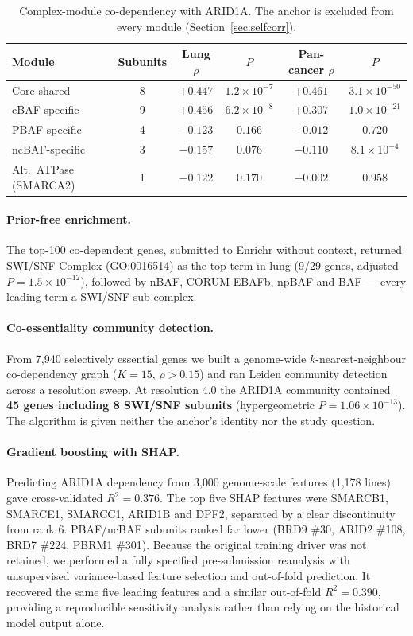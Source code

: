 \documentclass[11pt,a4paper]{article}
\begin{document}
\begin{table}[htbp]
\centering
\caption{Complex-module co-dependency with ARID1A. The anchor is excluded from
every module (Section~\ref{sec:selfcorr}).}
\label{tab:mod}
\small
\begin{tabular}{lccccc}
\toprule
\textbf{Module} & \textbf{Subunits} & \textbf{Lung $\rho$} & \textbf{$P$}
 & \textbf{Pan-cancer $\rho$} & \textbf{$P$} \\
\midrule
Core-shared    & 8 & $+0.447$ & $1.2\times10^{-7}$ & $+0.461$ & $3.1\times10^{-50}$ \\
cBAF-specific  & 9 & $+0.456$ & $6.2\times10^{-8}$ & $+0.307$ & $1.0\times10^{-21}$ \\
PBAF-specific  & 4 & $-0.123$ & $0.166$            & $-0.012$ & $0.720$ \\
ncBAF-specific & 3 & $-0.157$ & $0.076$            & $-0.110$ & $8.1\times10^{-4}$ \\
Alt.\ ATPase (SMARCA2) & 1 & $-0.122$ & $0.170$    & $-0.002$ & $0.958$ \\
\bottomrule
\end{tabular}
\end{table}

\paragraph{Prior-free enrichment.} The top-100 co-dependent genes, submitted to
Enrichr \citep{xie2021} without context, returned SWI/SNF Complex (GO:0016514) as
the top term in lung (9/29 genes, adjusted $P = 1.5\times10^{-12}$), followed by
nBAF, CORUM EBAFb, npBAF and BAF --- every leading term a SWI/SNF sub-complex.

\paragraph{Co-essentiality community detection.} From 7{,}940 selectively
essential genes we built a genome-wide $k$-nearest-neighbour co-dependency graph
($K = 15$, $\rho > 0.15$) and ran Leiden community detection \citep{traag2019}
across a resolution sweep. At resolution 4.0 the ARID1A community contained
\textbf{45 genes including 8 SWI/SNF subunits} (hypergeometric
$P = 1.06\times10^{-13}$). The algorithm is given neither the anchor's identity
nor the study question.

\paragraph{Gradient boosting with SHAP.} Predicting ARID1A dependency from 3{,}000
genome-scale features (1{,}178 lines) gave cross-validated $R^2 = 0.376$. The top
five SHAP features \citep{lundberg2020} were SMARCB1, SMARCE1, SMARCC1, ARID1B and
DPF2, separated by a clear discontinuity from rank 6. PBAF/ncBAF subunits ranked
far lower (BRD9 \#30, ARID2 \#108, BRD7 \#224, PBRM1 \#301). Because the original
training driver was not retained, we performed a fully specified pre-submission
reanalysis with unsupervised variance-based feature selection and out-of-fold
prediction. It recovered the same five leading features and a similar
out-of-fold $R^2=0.390$, providing a reproducible sensitivity analysis rather
than relying on the historical model output alone.
\end{document}
